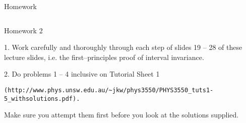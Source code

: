 \documentclass[xcolor=x11names,compress]{beamer}
\renewcommand{\(}{\begin{columns}}
\renewcommand{\)}{\end{columns}}
\newcommand{\<}[1]{\begin{column}{#1}}
\renewcommand{\>}{\end{column}}
\begin{document}
\begin{frame}[fragile]{Homework}
\begin{columns}
\column{\textwidth}
\begin{beamerboxesrounded}[upper=uppercol,lower=lowercol,shadow=true]{Homework 2}

1. Work carefully and thoroughly through each step of slides 19 -- 28 of these
lecture slides, i.e. the first--principles proof of interval invariance.\\

\bigskip

2. Do problems 1 -- 4 inclusive on Tutorial Sheet 1
{\tiny
\begin{verbatim} 
(http://www.phys.unsw.edu.au/~jkw/phys3550/PHYS3550_tuts1-5_withsolutions.pdf).
\end{verbatim}
}
Make sure you attempt them first before you look at the solutions supplied.

\end{beamerboxesrounded}
\end{columns}
\end{frame}
\end{document}
